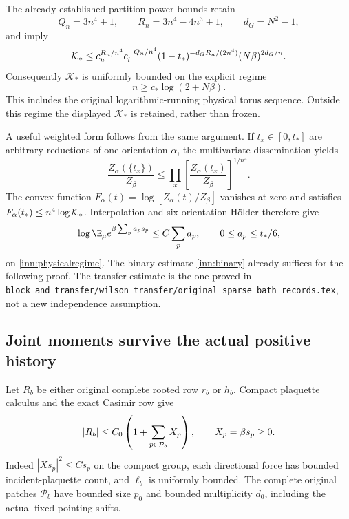 The already established partition-power bounds retain
\[
 Q_n=3n^4+1,\qquad R_n=3n^4-4n^3+1,\qquad d_G=N^2-1,
\]
and imply
\[
 {\cal K}_*\le
 c_u^{R_n/n^4}c_l^{-Q_n/n^4}
 (1-t_*)^{-d_GR_n/(2n^4)}(N\beta)^{2d_G/n}.
\]
Consequently $\mathcal K_*$ is uniformly bounded on the explicit regime
\begin{equation}
 n\ge c_*\log(2+N\beta).
 \label{inn:physicalregime}
\end{equation}
This includes the original logarithmic-running physical torus sequence. Outside this regime the displayed $\mathcal K_*$ is retained, rather than frozen.

A useful weighted form follows from the same argument. If $t_x\in[0,t_*]$ are arbitrary reductions of one orientation $\alpha$, the multivariate dissemination yields
\[
 \frac{Z_\alpha(\{t_x\})}{Z_\beta}
 \le\prod_x\left[\frac{Z_\alpha(t_x)}{Z_\beta}\right]^{1/n^4}.
\]
The convex function $F_\alpha(t)=\log[Z_\alpha(t)/Z_\beta]$ vanishes at zero and satisfies
$F_\alpha(t_*)\le n^4\log{\cal K}_*$. Interpolation and six-orientation H\"older therefore give
\begin{equation}
 \log\E_\mu e^{\beta\sum_pa_ps_p}\le C\sum_pa_p,
 \qquad 0\le a_p\le t_*/6,
 \label{inn:weighted}
\end{equation}
on \eqref{inn:physicalregime}. The binary estimate \eqref{inn:binary} already suffices for the following proof. The transfer estimate is the one proved in \texttt{block\_and\_transfer/wilson\_transfer/original\_sparse\_bath\_records.tex}, not a new independence assumption.

\subsection{Joint moments survive the actual positive history}

Let $R_b$ be either original complete rooted row $r_b$ or $h_b$. Compact plaquette calculus and the exact Casimir row give
\begin{equation}
 |R_b|\le C_0\left(1+\sum_{p\in{\cal P}_b}X_p\right),
 \qquad X_p=\beta s_p\ge0.
 \label{inn:rootenergy}
\end{equation}
Indeed $|X s_p|^2\le Cs_p$ on the compact group, each directional force has bounded incident-plaquette count, and $\ell_b$ is uniformly bounded. The complete original patches $\mathcal P_b$ have bounded size $p_0$ and bounded multiplicity $d_0$, including the actual fixed pointing shifts.

